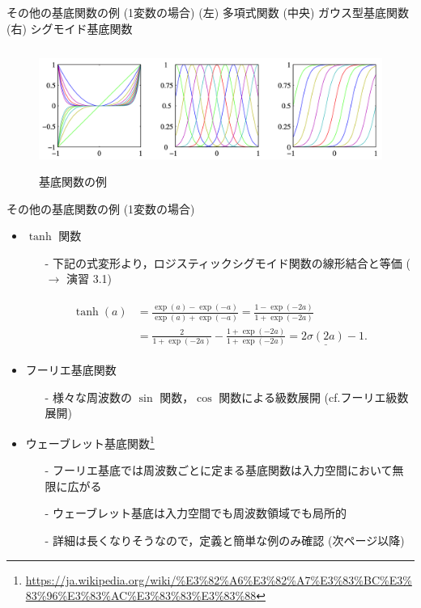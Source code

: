 \documentclass[uplatex,11pt,dvipdfmx,aspectratio=169,unicode,t]{beamer}
\numberwithin{equation}{section}
\newcommand{\1}{\bs{1}}
\newcommand{\0}{\bs{0}}
\begin{document}
\begin{frame}{その他の基底関数の例 (1変数の場合)}
    (左) 多項式関数 (中央) ガウス型基底関数 (右) シグモイド基底関数
    \begin{figure}
        \centering
        \includegraphics[height=4cm]{prml_fig_3-1.png}
        \caption{基底関数の例}
        \label{fig:3.1}
    \end{figure}
\end{frame}

\begin{frame}{その他の基底関数の例 (1変数の場合)}
    \begin{itemize}
        \item $\tanh$ 関数
        \begin{itemize}
            \item[-] 下記の式変形より，ロジスティックシグモイド関数の線形結合と等価 ($\longrightarrow$ 演習 3.1)
        \end{itemize}
        \begin{align} \label{eq:tanh}
            \begin{aligned}
                \tanh(a) &= \frac{\exp(a) - \exp(-a)}{\exp(a) + \exp(-a)} = \frac{1 - \exp(-2a)}{1 + \exp(-2a)} \\
                &= \frac{2}{1 + \exp(-2a)} - \frac{1 + \exp(-2a)}{1 + \exp(-2a)} = 2\underline{\sigma(2a)} - 1.
            \end{aligned}
        \end{align}
        \item フーリエ基底関数
        \begin{itemize}
            \item[-] 様々な周波数の $\sin$ 関数，$\cos$ 関数による級数展開 (cf.フーリエ級数展開)
        \end{itemize}
        \item ウェーブレット基底関数\footnote{\url{https://ja.wikipedia.org/wiki/\%E3\%82\%A6\%E3\%82\%A7\%E3\%83\%BC\%E3\%83\%96\%E3\%83\%AC\%E3\%83\%83\%E3\%83\%88}}
        \begin{itemize}
            \item[-] フーリエ基底では周波数ごとに定まる基底関数は入力空間において無限に広がる
            \item[-] ウェーブレット基底は入力空間でも周波数領域でも局所的
            \item[-] 詳細は長くなりそうなので，定義と簡単な例のみ確認 (次ページ以降)
        \end{itemize}
    \end{itemize}
\end{frame}
\end{document}
